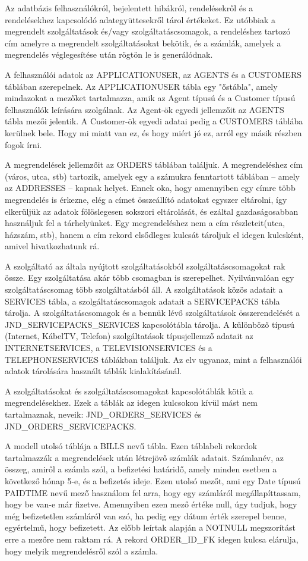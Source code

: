 \documentclass[centeredchapter]{thesis-ekf}
\theoremstyle{definition}
\theoremstyle{remark}
\begin{document}
Az adatbázis felhasználókról, bejelentett hibákról, rendelésekről és a rendelésekhez kapcsolódó adategyüttesekről tárol értékeket. Ez utóbbiak a megrendelt szolgáltatások és/vagy szolgáltatáscsomagok, a rendeléshez tartozó cím amelyre a megrendelt szolgáltatásokat bekötik, és a számlák, amelyek a megrendelés véglegesítése után rögtön le is generálódnak.

A felhasználói adatok az APPLICATIONUSER, az AGENTS és a CUSTOMERS táblában szerepelnek. Az APPLICATIONUSER tábla egy "őstábla", amely mindazokat a mezőket tartalmazza, amik az Agent típusú és a Customer típusú felhasználók leírására szolgálnak. Az Agent-ök egyedi jellemzőit az AGENTS tábla mezői jelentik. A Customer-ök egyedi adatai pedig a CUSTOMERS táblába kerülnek bele. Hogy mi miatt van ez, és hogy miért jó ez, arról egy másik részben fogok írni.

A megrendelések jellemzőit az ORDERS táblában találjuk. A megrendeléshez cím (város, utca, stb) tartozik, amelyek egy a számukra fenntartott táblában -- amely az ADDRESSES -- kapnak helyet. Ennek oka, hogy amennyiben egy címre több megrendelés is érkezne, elég a címet összeállító adatokat egyszer eltárolni, így elkerüljük az adatok fölöslegesen sokszori eltárolását, és ezáltal gazdaságosabban használjuk fel a tárhelyünket. Egy megrendeléshez nem a cím részleteit(utca, házszám, stb), hanem a cím rekord elsődleges kulcsát tároljuk el idegen kulcsként, amivel hivatkozhatunk rá.

A szolgáltató az általa nyújtott szolgáltatásokból szolgáltatáscsomagokat rak össze. Egy szolgáltatása akár több csomagban is szerepelhet. Nyilvánvalóan egy szolgáltatáscsomag több szolgáltatásból áll. A szolgáltatások közös adatait a SERVICES tábla, a szolgáltatáscsomagok adatait a SERVICEPACKS tábla tárolja. A szolgáltatáscsomagok és a bennük lévő szolgáltatások összerendelését a JND\_SERVICEPACKS\_SERVICES kapcsolótábla tárolja. A különböző típusú (Internet, KábelTV, Telefon) szolgáltatások típusjellemző adatait az INTERNETSERVICES, a TELEVISIONSERVICES és a TELEPHONESERVICES táblákban találjuk. Az elv ugyanaz, mint a felhasználói adatok tárolására használt táblák kialakításánál.

A szolgáltatásokat és szolgáltatáscsomagokat kapcsolótáblák kötik a megrendelésekhez. Ezek a táblák az idegen kulcsokon kívül mást nem tartalmaznak, neveik: JND\_ORDERS\_SERVICES és JND\_ORDERS\_SERVICEPACKS.

A modell utolsó táblája a BILLS nevű tábla. Ezen táblabeli rekordok tartalmazzák a megrendelések után létrejövő számlák adatait. Számlanév, az összeg, amiről a számla szól, a befizetési határidő, amely minden esetben a következő hónap 5-e, és a befizetés ideje. Ezen utolsó mezőt, ami egy Date típusú PAIDTIME nevű mező használom fel arra, hogy egy számláról megállapíttassam, hogy be van-e már fizetve. Amennyiben ezen mező értéke null, úgy tudjuk, hogy még befizetetlen számláról van szó, ha pedig egy dátum érték szerepel benne, egyértelmű, hogy befizetett. Az előbb leírtak alapján a NOTNULL megszorítást erre a mezőre nem raktam rá. A rekord ORDER\_ID\_FK idegen kulcsa elárulja, hogy melyik megrendelésről szól a számla.
\end{document}
